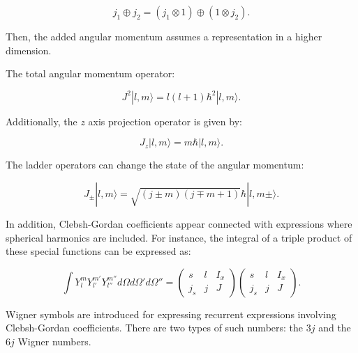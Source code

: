 \documentclass[openany]{book}
\begin{document}
\begin{equation}\label{eq:angularMomentum_tensorProduct_addition}
	j_1 \oplus j_2 = (j_1 \otimes 1) \oplus  (1 \otimes j_2). 
\end{equation}

Then, the added angular momentum assumes a representation in a higher dimension. 

The total angular momentum operator:

\begin{equation}\label{eq:angularMomentum_J2}
	J^2|l, m \rangle  = l(l+1)\hbar^2| l, m \rangle. 
\end{equation}

Additionally, the $z$ axis projection operator is given by: 

\begin{equation}\label{eq:angularMomentum_Jz}
	J_z|l, m \rangle  =m \hbar |l, m \rangle. 
\end{equation}

The ladder operators can change the state of the angular momentum:

\begin{equation}\label{eq:angularMomentum_Jladder}
	J_\pm|l, m \rangle  = \sqrt{(j \pm m)(j \mp m + 1)} \hbar |l, m \pm \rangle. 
\end{equation}



In addition, Clebsh-Gordan coefficients appear connected with expressions where spherical harmonics are included. For instance, the integral of a triple product of these special functions can be expressed as: 

\begin{equation}  \label{eq:angularMomentum_ClebshGordan_sphericalHarmonics}
	\int Y_l^{m} Y_{l'}^{m'}Y_{l''}^{m''} d\Omega d\Omega ' d\Omega '' = 	\left(\begin{array}{ccc}
		s &	l &	I_x \\
		j_s & j & J
	\end{array}\right) \left(\begin{array}{ccc}
	s &	l &	I_x \\
	j_s & j & J
\end{array}\right). 
\end{equation}

Wigner symbols are introduced for expressing recurrent expressions involving Clebsh-Gordan coefficients. There are two types of such numbers: the $3j$ and the $6j$ Wigner numbers. \\
\end{document}
